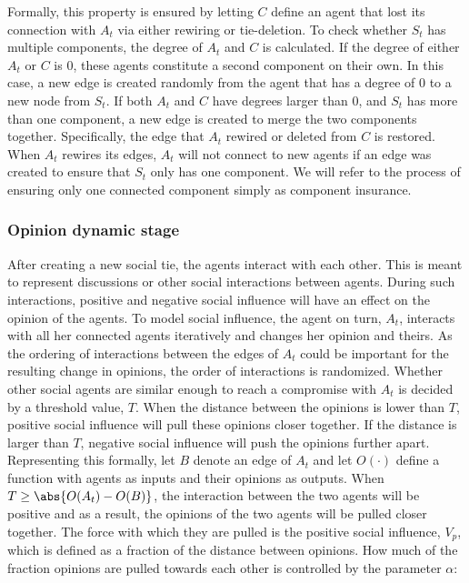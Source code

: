 \documentclass[11pt]{article}
\DeclarePairedDelimiter{\abs}\lvert\rvert
\begin{document}
Formally, this property is ensured by letting $C$ define an agent that lost its connection with $A_t$ via either rewiring or tie-deletion. To check whether $S_t$ has multiple components, the degree of $A_t$ and $C$ is calculated. If the degree of either $A_t$ or $C$ is 0, these agents constitute a second component on their own. In this case, a new edge is created randomly from the agent that has a degree of 0 to a new node from $S_t$.  
If both $A_t$ and $C$ have degrees larger than 0, and $S_t$ has more than one component, a new edge is created to merge the two components together. Specifically, the edge that $A_t$ rewired or deleted from $C$ is restored.
When $A_t$ rewires its edges, $A_t$ will not connect to new agents if an edge was created to ensure that $S_t$ only has one component.
We will refer to the process of ensuring only one connected component simply as component insurance. 

\subsubsection{Opinion dynamic stage}
After creating a new social tie, the agents interact with each other. This is meant to represent discussions or other social interactions between agents. During such interactions, positive and negative social influence will have an effect on the opinion of the agents. 
To model social influence, the agent on turn, $A_t$, interacts with all her connected agents iteratively and changes her opinion and theirs. 
As the ordering of interactions between the edges of $A_t$ could be important for the resulting change in opinions, the order of interactions is randomized. Whether other social agents are similar enough to reach a compromise with $A_t$ is decided by a threshold value, $T$. When the distance between the opinions is lower than $T$, positive social influence will pull these opinions closer together. If the distance is larger than $T$, negative social influence will push the opinions further apart.
Representing this formally, let $B$ denote an edge of $A_t$ and let $O(\cdot)$ define a function with agents as inputs and their opinions as outputs.
When $T \geq \abs{O(A_t) - O(B)}$, the interaction between the two agents will be positive and as a result, the opinions of the two agents will be pulled closer together. The force with which they are pulled is the positive social influence, $V_p$, which is defined as a fraction of the distance between opinions. How much of the fraction opinions are pulled towards each other is controlled by the parameter $\alpha$:
\end{document}
